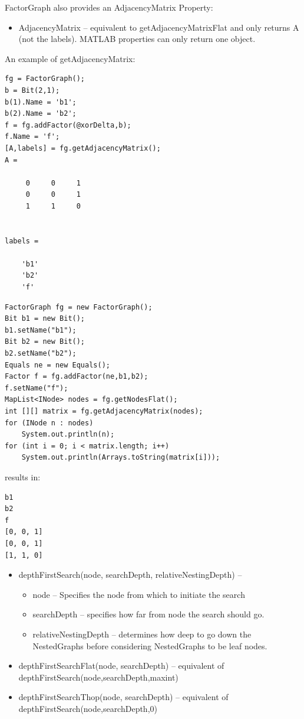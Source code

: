 FactorGraph also provides an AdjacencyMatrix Property:

\begin{itemize}
\item AdjacencyMatrix -- equivalent to getAdjacencyMatrixFlat \ifmatlab and only returns A (not the labels).  MATLAB properties can only return one object. \fi
\end{itemize}

An example of getAdjacencyMatrix:

\ifmatlab
\begin{lstlisting}
fg = FactorGraph();
b = Bit(2,1);
b(1).Name = 'b1';
b(2).Name = 'b2';
f = fg.addFactor(@xorDelta,b);
f.Name = 'f';
[A,labels] = fg.getAdjacencyMatrix();
A =

     0     0     1
     0     0     1
     1     1     0


labels = 

    'b1'
    'b2'
    'f'
\end{lstlisting}
\fi

\ifjava
\begin{lstlisting}
FactorGraph fg = new FactorGraph();
Bit b1 = new Bit();
b1.setName("b1");
Bit b2 = new Bit();
b2.setName("b2");
Equals ne = new Equals();
Factor f = fg.addFactor(ne,b1,b2);
f.setName("f");
MapList<INode> nodes = fg.getNodesFlat();
int [][] matrix = fg.getAdjacencyMatrix(nodes);
for (INode n : nodes)
	System.out.println(n);
for (int i = 0; i < matrix.length; i++)
	System.out.println(Arrays.toString(matrix[i]));
\end{lstlisting}

results in:

\begin{lstlisting}
b1
b2
f
[0, 0, 1]
[0, 0, 1]
[1, 1, 0]
\end{lstlisting}
\fi


\begin{itemize}
\item depthFirstSearch(node, searchDepth, relativeNestingDepth) -- 
\begin{itemize}
\item node -- Specifies the node from which to initiate the search
\item searchDepth -- specifies how far from node the search should go.
\item relativeNestingDepth -- determines how deep to go down the NestedGraphs before considering NestedGraphs to be leaf nodes. 
\end{itemize}
\item depthFirstSearchFlat(node, searchDepth) -- equivalent of depthFirstSearch(node,searchDepth,maxint)
\item depthFirstSearchThop(node, searchDepth) -- equivalent of depthFirstSearch(node,searchDepth,0)
\end{itemize}


